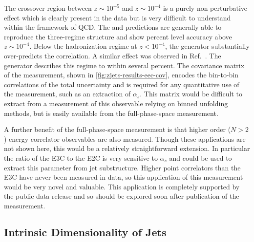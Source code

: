 The crossover region between $z \sim 10^{-5}$ and $z \sim 10^{-4}$ is a purely non-perturbative effect which is clearly present in the data but is very difficult to understand within the framework of QCD.
The \mgpy and \sherpa predictions are generally able to reproduce the three-regime structure and show percent level accuracy above $z \sim 10^{-4}$.
Below the hadronization regime at $z < 10^{-4}$, the \sherpa generator substantially over-predicts the correlation.
A similar effect was observed in Ref.~\cite{CMS:2024mlf}.
The \mgpy generator describes this regime to within several percent.
The covariance matrix of the measurement, shown in \cref{fig:zjets-results-eec-cov}, encodes the bin-to-bin correlations of the total uncertainty and is required for any quantitative use of the measurement, such as an extraction of $\alpha_s$.
This matrix would be difficult to extract from a measurement of this observable relying on binned unfolding methods, but is easily available from the full-phase-space measurement.

A further benefit of the full-phase-space measurement is that higher order ($N > 2$) energy correlator observables are also measured.
Though these applications are not shown here, this would be a relatively straightforward extension.
In particular the ratio of the E3C to the E2C is very sensitive to $\alpha_s$ and could be used to extract this parameter from jet substructure.
Higher point correlators than the E3C have never been measured in data, so this application of this measurement would be very novel and valuable.
This application is completely supported by the public data release and so should be explored soon after publication of the measurement.

\FloatBarrier

\subsection{Intrinsic Dimensionality of Jets}
\label{sec:zjets-results-id}

